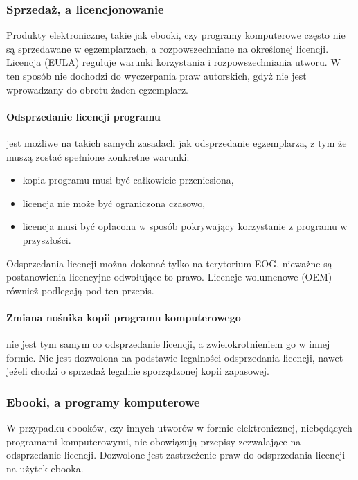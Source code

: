 \documentclass{article}
\begin{document}
\subsubsection{Sprzedaż, a licencjonowanie}

Produkty elektroniczne, takie jak ebooki, czy programy komputerowe często nie są sprzedawane w egzemplarzach, a rozpowszechniane na określonej licencji. Licencja (EULA) reguluje warunki korzystania i rozpowszechniania utworu. W ten sposób nie dochodzi do wyczerpania praw autorskich, gdyż nie jest wprowadzany do obrotu żaden egzemplarz.

\paragraph{Odsprzedanie licencji programu}

jest możliwe na takich samych zasadach jak odsprzedanie egzemplarza, z tym że muszą zostać spełnione konkretne warunki:
\begin{itemize}
  \item kopia programu musi być całkowicie przeniesiona,
  \item licencja nie może być ograniczona czasowo,
  \item licencja musi być opłacona w sposób pokrywający korzystanie z programu w przyszłości.
\end{itemize}
Odsprzedania licencji można dokonać tylko na terytorium EOG, nieważne są postanowienia licencyjne odwołujące to prawo. Licencje wolumenowe (OEM) również podlegają pod ten przepis.

\paragraph{Zmiana nośnika kopii programu komputerowego}

nie jest tym samym co odsprzedanie licencji, a zwielokrotnieniem go w innej formie. Nie jest dozwolona na podstawie legalności odsprzedania licencji, nawet jeżeli chodzi o sprzedaż legalnie sporządzonej kopii zapasowej.

\subsubsection{Ebooki, a programy komputerowe}

W przypadku ebooków, czy innych utworów w formie elektronicznej, niebędących programami komputerowymi, nie obowiązują przepisy zezwalające na odsprzedanie licencji. Dozwolone jest zastrzeżenie praw do odsprzedania licencji na użytek ebooka.
\end{document}
